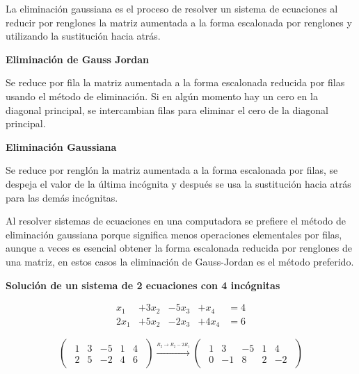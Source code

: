 \documentclass{article}
\begin{document}
La eliminación gaussiana es el proceso de resolver un sistema de ecuaciones al reducir por renglones la matriz aumentada a la forma escalonada por renglones y utilizando la sustitución hacia atrás.

\begin{tcolorbox}[colback=blue!10!white,colframe=blue!60!black,title=Métodos]
    \begin{large}
        \textbf{Eliminación de Gauss Jordan}
    \end{large}

    Se reduce por fila la matriz aumentada a la forma escalonada reducida por filas usando el método de eliminación. Si en algún momento hay un cero en la diagonal principal, se intercambian filas para eliminar el cero de la diagonal principal. \newline

    \begin{large}
        \textbf{Eliminación Gaussiana}
    \end{large}

    Se reduce por renglón la matriz aumentada a la forma escalonada por filas, se despeja el valor de la última incógnita y después se usa la sustitución hacia atrás para las demás incógnitas.
\end{tcolorbox}

Al resolver sistemas de ecuaciones en una computadora se prefiere el método de eliminación gaussiana porque significa menos operaciones elementales por filas, aunque a veces es esencial obtener la forma escalonada reducida por renglones de una matriz, en estos casos la eliminación de Gauss-Jordan es el método preferido.

\begin{large}
    \textbf{Solución de un sistema de 2 ecuaciones con 4 incógnitas}
\end{large}

\begin{equation*}
    \begin{aligned}
    x_1 &+ 3x_2 &- 5x_3 &+ x_4 &= 4 \\
    2x_1 &+ 5x_2 &- 2x_3 &+ 4x_4 &= 6    
    \end{aligned}
\end{equation*}

\begin{equation*}
    \begin{pmatrix}
        \begin{array}{rrrr|r}
            1 & 3 & -5 & 1 & 4\\
            2 & 5 & -2 & 4 & 6
        \end{array}
    \end{pmatrix}
\xrightarrow{\stackrel{R_2 \rightarrow R_2 - 2R_1}{}}
    \begin{pmatrix}
        \begin{array}{rrrr|r}
            1 & 3 & -5 & 1 & 4\\
            0 & -1 & 8 & 2 & -2
        \end{array}
    \end{pmatrix}
\end{equation*}
\end{document}
